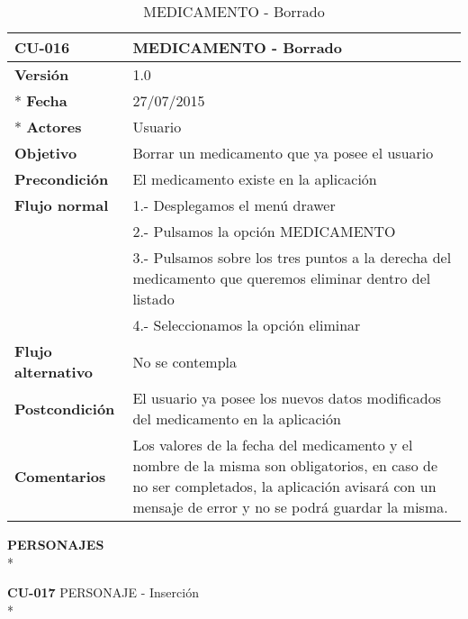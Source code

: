 \documentclass[../pfc.tex]{subfiles}
\begin{document}
		\begin{table}[H]
			\centering
			\begin{tabular}[t]{|p{3cm}|p{9.5cm}|}
				\hline \textbf{CU-016} & \textbf{MEDICAMENTO - Borrado} \\*
				\hline\hline \textbf{Versión} & 1.0 \\ *
				\hline\hline \textbf{Fecha} & 27/07/2015 \\ *
				\hline\textbf{Actores} 	& Usuario\\*
				\hline \textbf{Objetivo} & Borrar un medicamento que ya posee el usuario\\* 			
				\hline \textbf{Precondición} & El medicamento existe en la aplicación\\* 
				\hline \textbf{Flujo normal} & 1.- Desplegamos el menú drawer \\* 
				& 2.- Pulsamos la opción MEDICAMENTO\\*	
				& 3.- Pulsamos sobre los tres puntos a la derecha del medicamento que queremos eliminar dentro del listado\\*	
				& 4.- Seleccionamos la opción eliminar\\*	
				\hline \textbf{Flujo alternativo} & No se contempla \\* 
				\hline \textbf{Postcondición} & El usuario ya posee los nuevos datos modificados del medicamento en la aplicación \\* 
				\hline \textbf{Comentarios}   & Los valores de la fecha del medicamento y el nombre de la misma son obligatorios, en caso de no ser completados, la aplicación avisará con un mensaje de error y no se podrá guardar la misma.\\*
				\hline
			\end{tabular}
			\caption{MEDICAMENTO - Borrado}
			\label{tabla:caso016}
		\end{table}
		
		
		
		\textbf{PERSONAJES}\\*
		
		\textbf{CU-017}	PERSONAJE - Inserción\\*
		
\end{document}
